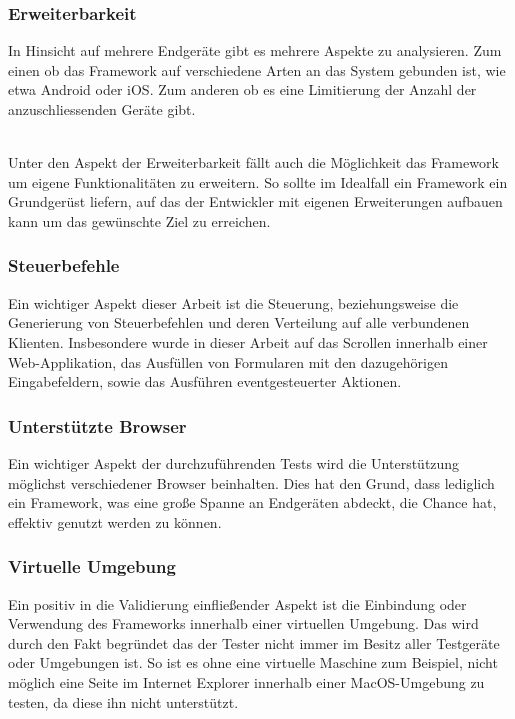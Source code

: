 	\pagebreak
	 \subsubsection{Erweiterbarkeit}
	 In Hinsicht auf mehrere Endgeräte gibt es mehrere Aspekte zu analysieren. Zum einen ob das Framework auf verschiedene 	Arten an das System gebunden ist, wie etwa Android oder iOS. Zum anderen ob es eine Limitierung der Anzahl der 				anzuschliessenden Geräte gibt. 

	\\Unter den Aspekt der Erweiterbarkeit fällt auch die Möglichkeit das Framework um eigene Funktionalitäten zu erweitern. So 		sollte im Idealfall ein Framework ein Grundgerüst liefern, auf das der Entwickler mit eigenen Erweiterungen aufbauen kann um 	das gewünschte Ziel zu erreichen.
	
	\subsubsection{Steuerbefehle}
	Ein wichtiger Aspekt dieser Arbeit ist die Steuerung, beziehungsweise die Generierung von Steuerbefehlen und deren Verteilung auf alle verbundenen Klienten. Insbesondere wurde in dieser Arbeit auf das Scrollen innerhalb einer \mbox{Web-Applikation}, das Ausfüllen von Formularen mit den dazugehörigen Eingabefeldern, sowie das Ausführen eventgesteuerter Aktionen.

	\subsubsection{Unterstützte Browser}
	Ein wichtiger Aspekt der durchzuführenden Tests wird die Unterstützung möglichst verschiedener Browser beinhalten. Dies hat 	den Grund, dass lediglich ein Framework, was eine große Spanne an Endgeräten abdeckt, die Chance hat, effektiv genutzt werden 	zu können.

	\subsubsection{Virtuelle Umgebung}
	Ein positiv in die Validierung einfließender Aspekt ist die Einbindung oder Verwendung des Frameworks innerhalb einer 			virtuellen Umgebung. Das wird durch den Fakt begründet das der Tester nicht immer im Besitz aller Testgeräte oder 				Umgebungen ist. So ist es ohne eine virtuelle Maschine zum Beispiel, nicht möglich eine Seite im Internet Explorer innerhalb 		einer MacOS-Umgebung zu testen, da diese ihn nicht unterstützt.

